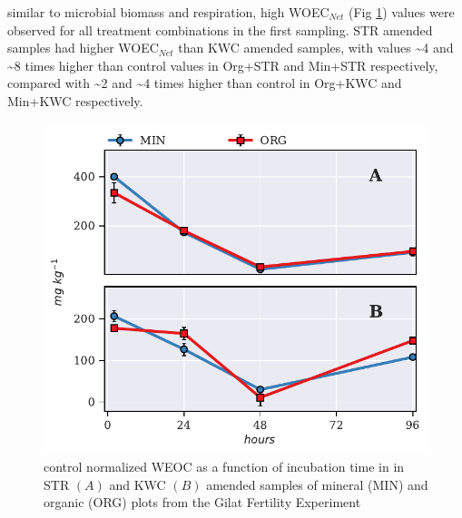 			similar to microbial biomass and respiration, high WOEC$_{Net}$ (Fig \ref{fig:nor_weoc_treated_preliminary}) values were observed for all treatment combinations in the first sampling. STR amended samples had higher WOEC$_{Net}$ than KWC amended samples, with values  \~{}4 and \~{}8 times higher than control values in Org+STR and Min+STR respectively, compared with \~{}2 and \~{}4 times higher than control in Org+KWC and Min+KWC respectively.


			\begin{figure}[H]
				\centering
				\includegraphics[scale=1]{thesis_figures/preliminary/control_normalized/WEOC.pdf}
				\caption{control normalized WEOC  as a function of incubation time in in STR $\left(A\right)$ and KWC $\left(B\right)$ amended samples of mineral (MIN) and organic (ORG) plots from the Gilat Fertility Experiment}
				\label{fig:nor_weoc_treated_preliminary}
			\end{figure}



